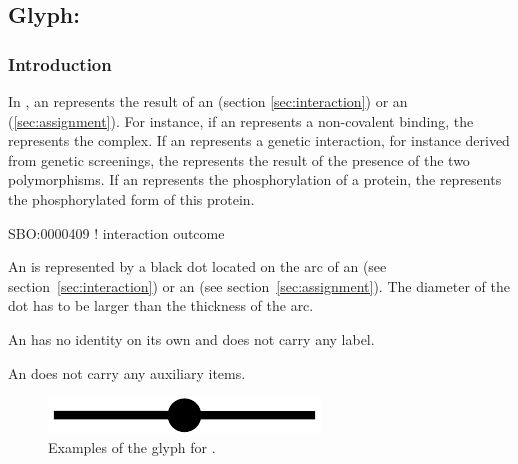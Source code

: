 
\color{red}
\subsection{Glyph: }\label{sec:outcome}

\subsubsection{Introduction}

In \ER, an  represents the result of an  (section \ref{sec:interaction}) or an  (\ref{sec:assignment}). For instance, if an  represents a non-covalent binding, the  represents the complex. If an  represents a genetic interaction, for instance derived from genetic screenings, the  represents the result of the presence of the two polymorphisms. If an  represents the phosphorylation of a protein, the  represents the phosphorylated form of this protein.

\begin{glyphDescription}

\glyphSboTerm SBO:0000409 ! interaction outcome

\glyphContainer  An  is represented by a black dot located on the arc of an  (see section~\ref{sec:interaction}) or an  (see section~\ref{sec:assignment}). The diameter of the dot has to be larger than the thickness of the arc.

\glyphLabel An  has no identity on its own and does not carry any label. 

\glyphAux An  does not carry any auxiliary items.

\end{glyphDescription}

\begin{figure}[H]
  \centering
  \includegraphics[scale = 0.3, trim = 0 0 0 0.25in]{images/outcome}
  \caption{Examples of the \ER glyph for .}
  \label{fig:outcome}
\end{figure}

\normalcolor
	
